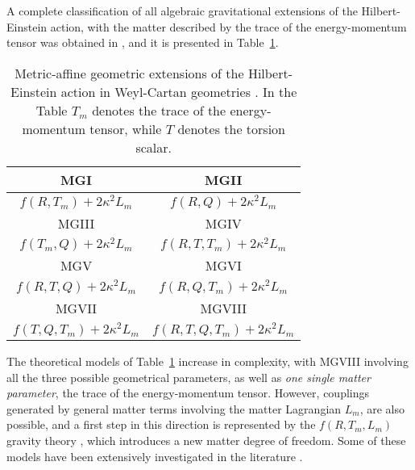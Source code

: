 \documentclass[aps,superscriptaddress, showpacs,preprintnumbers, superscriptaddress, nofootinbibt,twocolumn]{revtex4}
\begin{document}
A complete classification of all algebraic gravitational extensions of the Hilbert-Einstein action, with the matter described by the trace of the energy-momentum tensor was obtained in \cite{M1}, and it is presented in Table~\ref{class}.

\begin{center}
\begin{table}[htbp]
\begin{tabular}{||c||c||}
\hline
MGI & MGII \\
\hline
$f(R,T_m)+2\kappa ^{2}L_{m}$ & $%
f(R,Q)+2\kappa ^{2}L_{m}$ \\
\hline
MGIII & MGIV \\
\hline
$f(T_m,Q)+2\kappa ^{2}L_{m}$ & $%
f(R,T,T_m)+2\kappa
^{2}L_{m}$ \\
\hline
MGV & MGVI \\
\hline
$f(R,T,Q)+2\kappa ^{2}L_{m}$ &
$f(R,Q,T_m)+2\kappa
^{2}L_{m}$ \\
\hline
MGVII & MGVIII \\
\hline
$f(T,Q,T_m)+2\kappa
^{2}L_{m}$ & $f(R,T,Q,T_m)+2\kappa ^{2}L_{m}$ \\
\hline
\end{tabular}
\caption{Metric-affine geometric extensions of the Hilbert-Einstein action in Weyl-Cartan geometries \cite{M1}. In the Table $T_m$ denotes the trace of the energy-momentum tensor, while $T$ denotes the torsion scalar. }\label{class}
\end{table}
\end{center}

The theoretical models of Table~\ref{class} increase in complexity, with MGVIII involving all the three possible geometrical parameters, as well as {\it one single matter parameter}, the trace of the energy-momentum tensor. However, couplings generated by general matter terms involving the matter Lagrangian $L_m$, are also possible, and a first step in this direction is represented by the $f\left(R,T_m,L_m\right)$ gravity theory \cite{ZH}, which introduces a new matter degree of freedom. Some of these models have been extensively investigated in the literature \cite{M2,M3,M5}.
\end{document}
